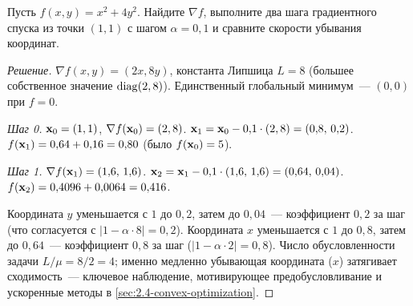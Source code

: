 \begin{problem}
\label{prob:gd-anisotropic}
Пусть $f(x, y) = x^2 + 4 y^2$. Найдите $\nabla f$, выполните два шага
градиентного спуска из точки $(1, 1)$ с шагом $\alpha = 0{,}1$ и
сравните скорости убывания координат.
\end{problem}

\begin{proof}[Решение]
$\nabla f(x, y) = (2x, 8y)$, константа Липшица $L = 8$ (большее
собственное значение $\operatorname{diag}(2, 8)$). Единственный глобальный минимум~---
$(0, 0)$ при $f = 0$.

\emph{Шаг 0.} $\mathbf{x}_0 = (1, 1)$, $\nabla f(\mathbf{x}_0) = (2, 8)$.
$\mathbf{x}_1 = \mathbf{x}_0 - 0{,}1 \cdot (2, 8) = (0{,}8,\, 0{,}2)$.
$f(\mathbf{x}_1) = 0{,}64 + 0{,}16 = 0{,}80$ (было $f(\mathbf{x}_0) = 5$).

\emph{Шаг 1.} $\nabla f(\mathbf{x}_1) = (1{,}6,\, 1{,}6)$.
$\mathbf{x}_2 = \mathbf{x}_1 - 0{,}1 \cdot (1{,}6,\, 1{,}6) = (0{,}64,\, 0{,}04)$.
$f(\mathbf{x}_2) = 0{,}4096 + 0{,}0064 = 0{,}416$.

Координата $y$ уменьшается с $1$ до $0{,}2$, затем до $0{,}04$~---
коэффициент $0{,}2$ за шаг (что согласуется с
$|1 - \alpha \cdot 8| = 0{,}2$). Координата $x$ уменьшается с $1$ до
$0{,}8$, затем до $0{,}64$~--- коэффициент $0{,}8$ за шаг
($|1 - \alpha \cdot 2| = 0{,}8$). Число обусловленности задачи
$L/\mu = 8/2 = 4$; именно медленно убывающая координата ($x$)
затягивает сходимость~--- ключевое наблюдение, мотивирующее
предобусловливание и ускоренные методы в
\cref{sec:2.4-convex-optimization}.
\end{proof}
